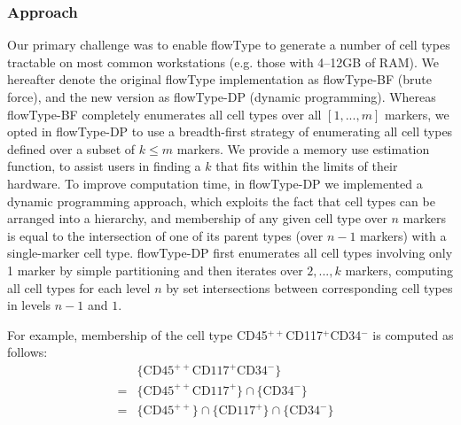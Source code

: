 \subsubsection{Approach}
Our primary challenge was to enable flowType to generate a number of cell types tractable on most common workstations (e.g. those with 4--12GB of RAM).
We hereafter denote the original flowType implementation as flowType-BF (brute force), and the new version as flowType-DP (dynamic programming).
Whereas flowType-BF completely enumerates all cell types over all $[1,...,m]$ markers, we opted  in flowType-DP to use a breadth-first strategy of enumerating all cell types defined over a subset of $k\leq m$ markers. %
We provide a memory use estimation function, to assist users in finding a $k$ that fits within the limits of their hardware.
To improve computation time, in flowType-DP we implemented a dynamic programming approach, which exploits the fact that cell types can be arranged into a hierarchy, and membership of any given cell type over $n$ markers is equal to the intersection of one of its parent types (over $n-1$ markers) with a single-marker cell type.
flowType-DP first enumerates all cell types involving only 1 marker by simple partitioning and then iterates over $2,...,k$ markers, computing all cell types for each level $n$ by set intersections between corresponding cell types in levels $n-1$ and $1$.

For example, membership of the cell type CD45$^{++}$CD117$^+$CD34$^-$ is computed as follows:
\begin{align}
  &\lbrace \text{CD45}^{++}\text{CD117}^+\text{CD34}^-\rbrace & \nonumber
  \\= &\lbrace \text{CD45}^{++}\text{CD117}^+ \rbrace \cap \lbrace \text{CD34}^- \rbrace & \nonumber
  \\= &\lbrace \text{CD45}^{++} \rbrace \cap \lbrace \text{CD117}^+ \rbrace \cap \lbrace \text{CD34}^- \rbrace &
\end{align}

